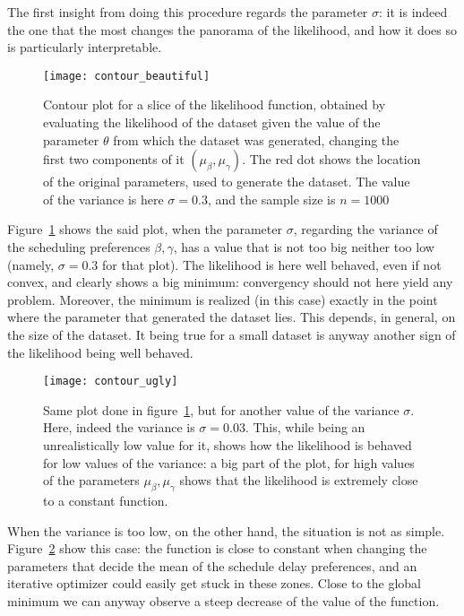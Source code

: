 The first insight from doing this procedure regards the parameter \(\sigma\):
it is indeed the one that the most changes the panorama of the likelihood,
and how it does so is particularly interpretable.

\begin{figure}
  \centering
  \texttt{[image: contour\_beautiful]}
  \caption{Contour plot for a slice of the likelihood function,
    obtained by evaluating the likelihood of the dataset given the value of the parameter \(\theta\) from which the dataset was generated,
    changing the first two components of it \((\mu_\beta, \mu_\gamma)\).
    The red dot shows the location of the original parameters, used to generate the dataset.
    The value of the variance is here \(\sigma = 0.3\),
  and the sample size is \(n = 1000\)}
  \label{fig:contour_mid_var}
\end{figure}

Figure~\ref{fig:contour_mid_var} shows the said plot,
when the parameter \(\sigma\), regarding the variance of the scheduling preferences \(\beta, \gamma\),
has a value that is not too big neither too low (namely, \(\sigma = 0.3\) for that plot).
The likelihood is here well behaved,
even if not convex, and clearly shows a big minimum:
convergency should not here yield any problem.
Moreover, the minimum is realized (in this case) exactly in the point where the parameter that generated the dataset lies.
This depends, in general, on the size of the dataset.
It being true for a small dataset is anyway another sign of the likelihood being well behaved.

\begin{figure}
  \centering
  \texttt{[image: contour\_ugly]}
  \caption{Same plot done in figure~\ref{fig:contour_mid_var}, but for another value of the variance \(\sigma\).
    Here, indeed the variance is \(\sigma = 0.03\).
    This, while being an unrealistically low value for it, shows how the likelihood is behaved for low values of the variance:
    a big part of the plot,
  for high values of the parameters \(\mu_\beta, \mu_\gamma\) shows that the likelihood is extremely close to a constant function.}
  \label{fig:contour_low_var}
\end{figure}

When the variance is too low, on the other hand,
the situation is not as simple.
Figure~\ref{fig:contour_low_var} show this case:
the function is close to constant when changing the parameters that decide the mean of the schedule delay preferences,
and an iterative optimizer could easily get stuck in these zones.
Close to the global minimum we can anyway observe a steep decrease of the value of the function.

